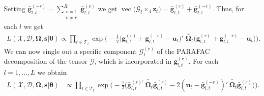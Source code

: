 \documentclass[12pt,a4paper]{article}
\DeclareMathOperator*{\vect}{vec}		%
\newcommand*\vecc[1]{\vect\big(#1\big)}
\theoremstyle{custom}
\begin{document}
Setting $\bar{\mathbf{g}}_{l,t}^{(-r)} = \sum_{\substack{v=1 \\ v\neq r}}^R \bar{\mathbf{g}}_{l,t}^{(v)}$ we get $\vecc{\mathcal{G}_l \times_4 \mathbf{z}_t} = \bar{\mathbf{g}}_{l,t}^{(r)} + \bar{\mathbf{g}}_{l,t}^{(-r)}$.
Thus, for each $l$ we get
\begin{align}
L(\boldsymbol{\mathcal{X}},\mathcal{D},\boldsymbol{\Omega},\mathbf{s}|\boldsymbol{\theta}) \propto \prod_{t\in\mathcal{T}_l} \exp\Big( -\frac{1}{2} \big( \bar{\mathbf{g}}_{l,t}^{(r)} + \bar{\mathbf{g}}_{l,t}^{(-r)} - \mathbf{u}_t \big)' \; \bar{\bar{\boldsymbol{\Omega}}}_t \big( \bar{\mathbf{g}}_{l,t}^{(r)} + \bar{\mathbf{g}}_{l,t}^{(-r)} - \mathbf{u}_t \big) \Big).
\label{eq:apdx_likelihood_gltr}
\end{align}
We can now single out a specific component $\mathcal{G}_l^{(r)}$ of the PARAFAC decomposition of the tensor $\mathcal{G}$, which is incorporated in $\bar{\mathbf{g}}_{l,t}^{(r)}$. For each $l=1,\ldots,L$ we obtain
\begin{align}
L(\boldsymbol{\mathcal{X}},\mathcal{D},\boldsymbol{\Omega},\mathbf{s}|\boldsymbol{\theta}) & \propto \prod_{t\in\mathcal{T}_l} \exp\Big( -\frac{1}{2} \Big( \bar{\mathbf{g}}_{l,t}^{(r)\prime} \: \bar{\bar{\boldsymbol{\Omega}}}_t \bar{\mathbf{g}}_{l,t}^{(r)} -2 ( \mathbf{u}_t - \bar{\mathbf{g}}_{l,t}^{(-r)})' \: \bar{\bar{\boldsymbol{\Omega}}}_t \bar{\mathbf{g}}_{l,t}^{(r)} \Big) \Big).
\label{eq:apdx_likelihood_all_gammas}
\end{align}
\end{document}
